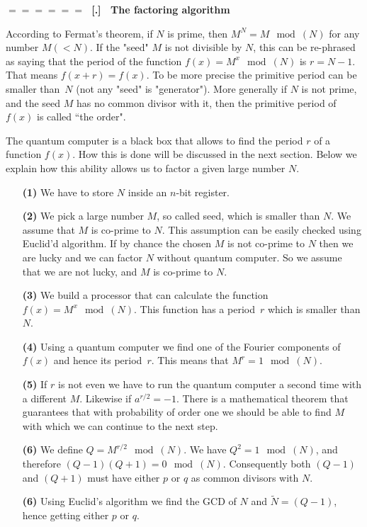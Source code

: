 \documentclass[onecolumn,fleqn]{revtex4}
\renewcommand{\thesubsection}{\arabic{subsection}}
\renewcommand{\thesubsubsection}{\arabic{subsubsection}}
\newcommand{\sheadC}[1]
{
\addtocounter{subsubsection}{1}
\vspace{5mm}
{\Large\bf $=\!=\!=\!=\!=\!=\;$ [\thesubsection.\thesubsubsection] \ #1}  
\nopagebreak
\phantomsection
}
\begin{document}
\sheadC{The factoring algorithm}


According to Fermat's  theorem, if $N$ is prime, 
then $M^N=M \mod(N)$ for any number $M (<N)$.
If the "seed" $M$ is not divisible by $N$, 
this can be re-phrased as saying that the period  
of the function $f(x)=M^x \mod(N)$ is $r=N{-}1$.
That means ${f(x+r)=f(x)}$. 
To be more precise the primitive period can be smaller 
than~$N$ (not any "seed" is "generator"). 
More generally if $N$ is not prime, 
and the seed $M$ has no common divisor with it, 
then the primitive period of $f(x)$ 
is called ``the order".


The quantum computer is a black box that allows 
to find the period $r$ of a function $f(x)$. 
How this is done will be discussed in the 
next section. Below we explain how this ability 
allows us to factor a given large number $N$. 
\begin{itemize}
\item[{\bf (1)}] 
We have to store $N$ inside an $n$-bit register. 
\item[{\bf (2)}] 
We pick a large number $M$, so called seed, which is smaller than $N$. 
We assume that $M$ is co-prime to $N$. This assumption can be 
easily checked using Euclid'd algorithm. If by chance the chosen $M$ is not 
co-prime to $N$ then we are lucky and we can factor $N$ without quantum computer. 
So we assume that we are not lucky, and $M$ is co-prime to $N$.
\item[{\bf (3)}] 
We build a processor that can calculate the function $f(x)=M^x \mod(N)$. 
This function has a period~$r$ which is smaller than $N$. 
\item[{\bf (4)}] 
Using a quantum computer we find one of the Fourier components 
of $f(x)$ and hence its period~$r$. This means that $M^r = 1 \mod(N)$.
\item[{\bf (5)}] 
If $r$ is not even we have to run the quantum computer a second 
time with a different $M$. Likewise if ${a^{r/2}=-1}$. 
There is a mathematical theorem that guarantees 
that with probability of order one we should be able 
to find $M$ with which we can continue to the next step. 
\item[{\bf (6)}] 
We define $Q=M^{r/2} \mod(N)$.  We have $Q^2=1 \mod(N)$, 
and therefore ${(Q-1)(Q+1)=0 \mod(N)}$. 
Consequently both $(Q-1)$ and $(Q+1)$ must have either $p$ or $q$  
as common divisors with $N$. 
\item[{\bf (6)}] 
Using Euclid's algorithm we find the GCD of $N$ and $\tilde{N}=(Q-1)$, 
hence getting either $p$ or $q$.        
\end{itemize}
\end{document}
